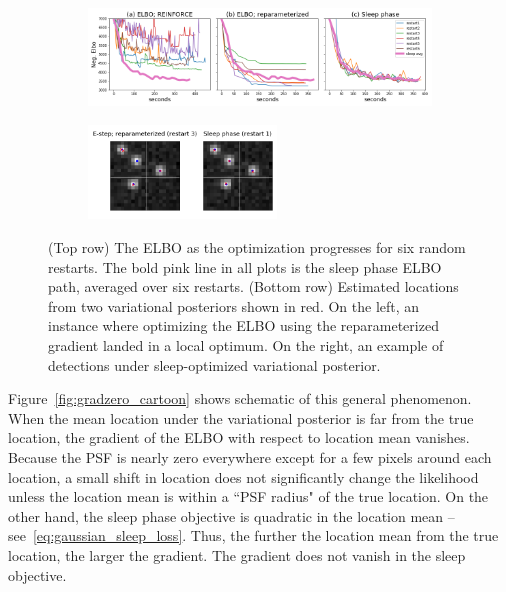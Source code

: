 \begin{figure}[!htb]
    \centering
    \begin{subfigure}[t]{0.9\textwidth}
    \centering
    \includegraphics[width=\textwidth]{figures/optim_path_compare.png}
    \end{subfigure}
    \begin{subfigure}[t]{\textwidth}
    \centering
    \includegraphics[width=0.55\textwidth]{figures/optim_path_detect_compare.png}
    \end{subfigure}
    \vspace{-3em}
    \caption{(Top row) The ELBO as the optimization progresses 
    for six random restarts. 
    The bold pink line in all plots is the sleep phase ELBO path, averaged over six restarts. 
    (Bottom row) Estimated locations from two variational posteriors shown in red. On the left, an instance where optimizing the ELBO using the reparameterized gradient landed in a local optimum.
    On the right, an example of detections under 
    sleep-optimized variational posterior. }
    \label{fig:optim_path}
\end{figure}

Figure~\ref{fig:gradzero_cartoon} shows schematic of this general phenomenon. When the mean location under the variational posterior is far from the true location, the gradient of the ELBO with respect to location mean vanishes. 
Because the PSF is nearly zero everywhere except for a few pixels around each location, a small shift in location does not significantly change the likelihood unless the location mean is within a ``PSF radius" of the true location.
On the other hand, the sleep phase objective is quadratic in the location mean -- see~\eqref{eq:gaussian_sleep_loss}. Thus, the further the location mean from the true location, the larger the gradient. The gradient does not vanish in the sleep objective. 


